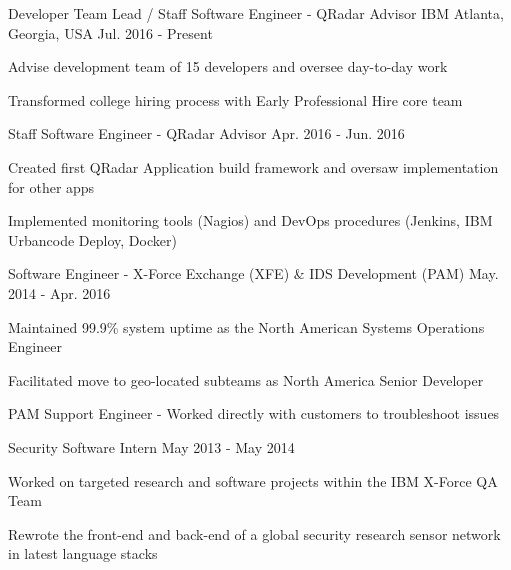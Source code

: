 
\begin{cventries}

  \cventry
    {Developer Team Lead / Staff Software Engineer - QRadar Advisor} %
    {IBM} %
    {Atlanta, Georgia, USA} %
    {Jul. 2016 - Present} %
    {
      \begin{cvitems}
        \item {Advise development team of 15 developers and oversee day-to-day work}
        \item {Transformed college hiring process with Early Professional Hire core team}
      \end{cvitems}
    }

  \cventry
    {Staff Software Engineer - QRadar Advisor}
    {}
    {}
    {Apr. 2016 - Jun. 2016}
    {
      \begin{cvitems}
        \item {Created first QRadar Application build framework and oversaw implementation for other apps}
        \item {Implemented monitoring tools (Nagios) and DevOps procedures (Jenkins, IBM Urbancode Deploy, Docker)}
      \end{cvitems}
    }

  \cventry
    {Software Engineer - X-Force Exchange (XFE) \& IDS Development (PAM)}
    {}
    {}
    {May. 2014 - Apr. 2016}
    {
    \begin{cvitems}
      \item {Maintained 99.9\% system uptime as the North American Systems Operations Engineer}
      \item {Facilitated move to geo-located subteams as North America Senior Developer}
      \item {PAM Support Engineer - Worked directly with customers to troubleshoot issues}
    \end{cvitems}
    }

  \cventry
    {Security Software Intern}
    {}
    {}
    {May 2013 - May 2014}
    {
    \begin{cvitems}
      \item {Worked on targeted research and software projects within the IBM X-Force QA Team}
      \item {Rewrote the front-end and back-end of a global security research sensor network in latest language stacks}
    \end{cvitems}
    }


\end{cventries}
